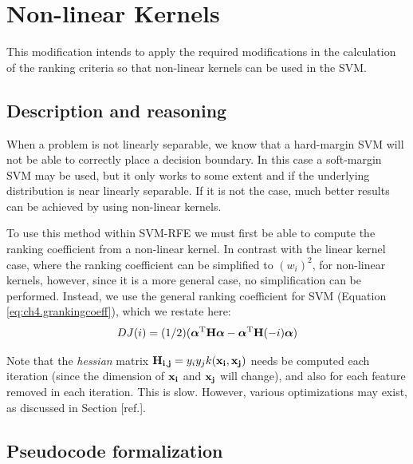 \chapter{Non-linear Kernels} %

\label{Chapter1} %
\label{eq:ch4.grankingcoeff}


This modification intends to apply the required modifications in the calculation of the ranking criteria so that non-linear kernels can be used in the SVM.

\section{Description and reasoning}
\label{sec:stopCond.desc}

When a problem is not linearly separable, we know that a hard-margin SVM will not be able to correctly place a decision boundary. In this case a soft-margin SVM may be used, but it only works to some extent and if the underlying distribution is near linearly separable. If it is not the case, much better results can be achieved by using non-linear kernels.

To use this method within SVM-RFE we must first be able to compute the ranking coefficient from a non-linear kernel. In contrast with the linear kernel case, where the ranking coefficient can be simplified to $(w_i)^2$, for non-linear kernels, however, since it is a more general case, no simplification can be performed. Instead, we use the general ranking coefficient for SVM (Equation \ref{eq:ch4.grankingcoeff}), which we restate here:
\begin{align*}
    DJ(i) = (1/2)(\boldsymbol{\alpha}^{\text{T}} \mathbf{H} \boldsymbol{\alpha} - \boldsymbol{\alpha}^{\text{T}} \mathbf{H}(-i) \boldsymbol{\alpha})
\end{align*}

Note that the \emph{hessian} matrix $\mathbf{H_{i,j}} = y_iy_jk(\mathbf{x_i}, \mathbf{x_j})$ needs be computed each iteration (since the dimension of $\mathbf{x_i}$ and $\mathbf{x_j}$ will change), and also for each feature removed in each iteration. This is slow. However, various optimizations may exist, as discussed in Section [ref.].

\section{Pseudocode formalization}

